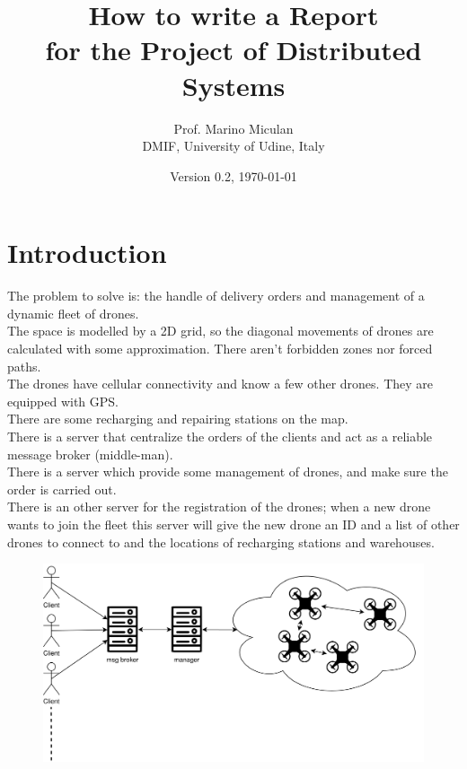 \documentclass[a4paper, oneside]{memoir}
\title{How to write a Report\\ for the Project of Distributed Systems}
\author{Prof. Marino Miculan\\ DMIF, University of Udine, Italy}
\date{Version 0.2, \today}
\begin{document}
\maketitle

\chapter{Introduction}\label{ch:intro}

The problem to solve is: the handle of delivery orders and management of a dynamic fleet of drones.\\
The space is modelled by a 2D grid, so the diagonal movements of drones are calculated with some approximation. There aren't forbidden zones nor forced paths.\\
The drones have cellular connectivity and know a few other drones. They are equipped with GPS.\\
There are some recharging and repairing stations on the map.\\
There is a server that centralize the orders of the clients and act as a reliable message broker (middle-man).\\
There is a server which provide some management of drones, and make sure the order is carried out.\\
There is an other server for the registration of the drones; when a new drone wants to join the fleet this server will give the new drone an ID and a list of other drones to connect to and the locations of recharging stations and warehouses.

\begin{figure}[h!]
	\centering
	\includegraphics[width=\linewidth]{Overview}
\end{figure}
\end{document}
